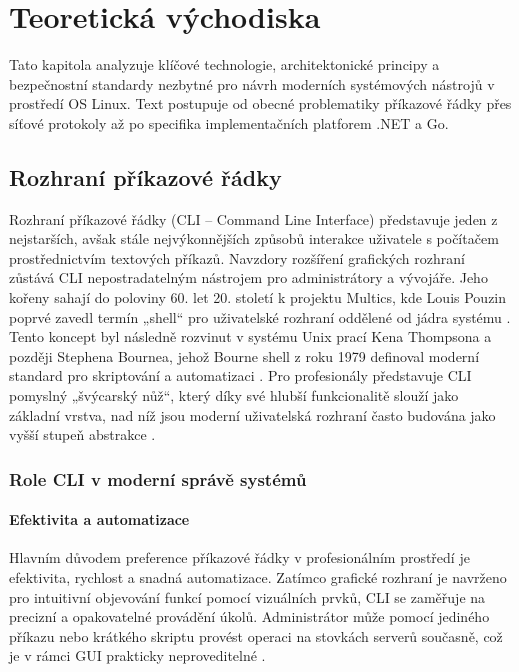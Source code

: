 \chapter{Teoretická východiska}
\label{chap:teorie}

Tato kapitola analyzuje klíčové technologie, architektonické principy a bezpečnostní standardy nezbytné pro návrh moderních systémových nástrojů v prostředí OS Linux. Text postupuje od obecné problematiky příkazové řádky přes síťové protokoly až po specifika implementačních platforem .NET a Go.

\section{Rozhraní příkazové řádky}
\label{sec:cli_teorie}
Rozhraní příkazové řádky (CLI – Command Line Interface) představuje jeden z nejstarších, avšak stále nejvýkonnějších způsobů interakce uživatele s počítačem prostřednictvím textových příkazů. Navzdory rozšíření grafických rozhraní zůstává CLI nepostradatelným nástrojem pro administrátory a vývojáře. Jeho kořeny sahají do poloviny 60. let 20. století k projektu Multics, kde Louis Pouzin poprvé zavedl termín „shell“ pro uživatelské rozhraní oddělené od jádra systému \cite{raymond_unix}. Tento koncept byl následně rozvinut v systému Unix prací Kena Thompsona a později Stephena Bournea, jehož Bourne shell z roku 1979 definoval moderní standard pro skriptování a automatizaci \cite{raymond_unix}. Pro profesionály představuje CLI pomyslný „švýcarský nůž“, který díky své hlubší funkcionalitě slouží jako základní vrstva, nad níž jsou moderní uživatelská rozhraní často budována jako vyšší stupeň abstrakce \cite{fateh_cli_explained}.

\subsection{Role CLI v moderní správě systémů}
\subsubsection{Efektivita a automatizace}
Hlavním důvodem preference příkazové řádky v profesionálním prostředí je efektivita, rychlost a snadná automatizace. Zatímco grafické rozhraní je navrženo pro intuitivní objevování funkcí pomocí vizuálních prvků, CLI se zaměřuje na precizní a opakovatelné provádění úkolů. Administrátor může pomocí jediného příkazu nebo krátkého skriptu provést operaci na stovkách serverů současně, což je v rámci GUI prakticky neproveditelné \cite{raymond_unix}.

